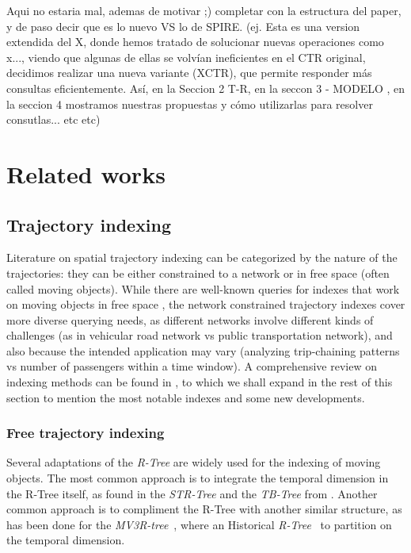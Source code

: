 \documentclass[runningheads]{llncs}
\newcommand{\ctr}{XCTR}
\begin{document}
Aqui no estaria mal, ademas de motivar ;) completar con la estructura del paper, y de paso decir que es lo nuevo VS lo de SPIRE. (ej. Esta es una version extendida del X, donde hemos tratado de solucionar nuevas operaciones como x..., viendo que algunas de ellas se volvían ineficientes en el CTR original, decidimos realizar una nueva variante (\ctr), que permite responder más consultas eficientemente. Así, en la Seccion 2 T-R, en la seccon 3 - MODELO , en la seccion 4 mostramos nuestras propuestas y cómo utilizarlas para resolver consutlas... etc etc)



\section{Related works}
\subsection{Trajectory indexing}
Literature on spatial trajectory indexing can be categorized by the nature of the trajectories: they can be either constrained to a network or in free space (often called moving objects). While there are well-known queries for indexes that work on moving objects in free space \cite{DBLP:conf/vldb/PfoserJT00}, the network constrained trajectory indexes cover more diverse querying needs, as different networks involve different kinds of challenges (as in vehicular road network vs public transportation network), and also because the intended application may vary (analyzing trip-chaining patterns vs number of passengers within a time window). A comprehensive review on indexing methods can be found in \cite[Chapter 4]{DBLP:books/sp/PelekisT14}, to which we shall expand in the rest of this section to mention the most notable indexes and some new developments.

\subsubsection{Free trajectory indexing}
Several adaptations of the {\em R-Tree} \cite{DBLP:conf/sigmod/Guttman84} are widely used for the indexing of moving objects. The most common approach is to integrate the temporal dimension in the R-Tree itself, as found in the {\em STR-Tree} and the {\em TB-Tree} from \cite{DBLP:conf/vldb/PfoserJT00}.
Another common approach is to compliment the R-Tree with another similar structure, as has been done for the {\em MV3R-tree}~\cite{DBLP:conf/vldb/PapadiasT01},
where an Historical {\em R-Tree}~\cite{nascimento1998towards} to partition on the temporal dimension.
\end{document}
